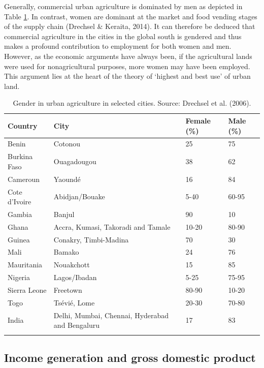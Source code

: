 Generally, commercial urban agriculture is dominated by men as depicted in Table \ref{tbl:genderinUA}. In contrast, women are dominant at the market and food vending stages of the supply chain (Drechsel \& Keraita, 2014). It can therefore be deduced that commercial agriculture in the cities in the global south is gendered and thus makes a profound contribution to employment for both women and men. However, as the economic arguments have always been, if the agricultural lands were used for nonagricultural purposes, more women may have been employed. This argument lies at the heart of the theory of ‘highest and best use’ of urban land.

\begin{table}[th]
\caption{Gender in urban agriculture in selected cities. Source: Drechsel et al. (2006).}
\begin{center}
\begin{tabular}{ p{} p{} p{} p{} } 
\hline
Country & City & Female (\%) & Male (\%) \\
\hline
Benin & Cotonou & 25 & 75 \\
Burkina Faso & Ouagadougou & 38 & 62 \\
Cameroun & Yaoundé & 16 & 84 \\
Cote d'Ivoire & Abidjan/Bouake & 5-40 & 60-95 \\
Gambia & Banjul & 90 & 10 \\
Ghana & Accra, Kumasi, Takoradi and Tamale & 10-20 & 80-90 \\
Guinea & Conakry, Timbi-Madina & 70 & 30 \\
Mali & Bamako & 24 & 76 \\
Mauritania & Nouakchott & 15 & 85 \\
Nigeria & Lagos/Ibadan & 5-25 & 75-95 \\
Sierra Leone & Freetown & 80-90 & 10-20 \\
Togo & Tsévié, Lome & 20-30 & 70-80 \\
India & Delhi, Mumbai, Chennai, Hyderabad and Bengaluru & 17 & 83 \\
\hline
\label{tbl:genderinUA}
\end{tabular}
\end{center}
\end{table}

\subsection{Income generation and gross domestic product}

